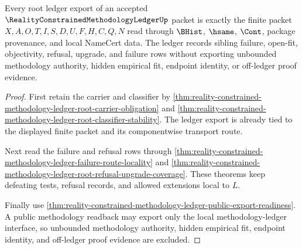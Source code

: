 \begin{theorem}
\label{thm:reality-constrained-methodology-ledger-root-ledger-exactness}
Every root ledger export of an accepted $\RealityConstrainedMethodologyLedgerUp$ packet is exactly the finite packet $X,A,O,T,I,S,D,U,F,H,C,Q,N$ read through $\BHist$, $\hsame$, $\Cont$, package provenance, and local NameCert data. The ledger records sibling failure, open-fit, objectivity, refusal, upgrade, and failure rows without exporting unbounded methodology authority, hidden empirical fit, endpoint identity, or off-ledger proof evidence.
\end{theorem}
\begin{proof}
First retain the carrier and classifier by \autoref{thm:reality-constrained-methodology-ledger-root-carrier-obligation} and \autoref{thm:reality-constrained-methodology-ledger-root-classifier-stability}. The ledger export is already tied to the displayed finite packet and its componentwise transport route.

Next read the failure and refusal rows through \autoref{thm:reality-constrained-methodology-ledger-failure-route-locality} and \autoref{thm:reality-constrained-methodology-ledger-root-refusal-upgrade-coverage}. These theorems keep defeating tests, refusal records, and allowed extensions local to $L$.

Finally use \autoref{thm:reality-constrained-methodology-ledger-public-export-readiness}. A public methodology readback may export only the local methodology-ledger interface, so unbounded methodology authority, hidden empirical fit, endpoint identity, and off-ledger proof evidence are excluded.
\end{proof}
